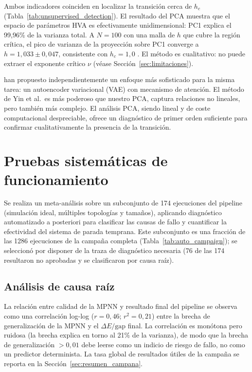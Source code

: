 \documentclass[11pt,a4paper,spanish]{book}
\begin{document}
Ambos indicadores coinciden en localizar la transición cerca de $h_c$ (Tabla~\ref{tab:unsupervised_detection}). El resultado del PCA muestra que el espacio de parámetros HVA es efectivamente unidimensional: PC1 explica el 99,96\% de la varianza total. A $N = 100$ con una malla de $h$ que cubre la región crítica, el pico de varianza de la proyección sobre PC1 converge a $h = 1,033 \pm 0,047$, consistente con $h_c = 1,0$ \citep{dutta2015}. El método es cualitativo: no puede extraer el exponente crítico $\nu$ (véase Sección~\ref{sec:limitaciones}).

\citet{yin2025} han propuesto independientemente un enfoque más sofisticado para la misma tarea: un autoencoder variacional (VAE) con mecanismo de atención. El método de Yin et al.\ es más poderoso que nuestro PCA, captura relaciones no lineales, pero también más complejo. El análisis PCA, siendo lineal y de coste computacional despreciable, ofrece un diagnóstico de primer orden suficiente para confirmar cualitativamente la presencia de la transición.

\section{Pruebas sistemáticas de funcionamiento}

Se realiza un meta-análisis sobre un subconjunto de 174 ejecuciones del pipeline (simulación ideal, múltiples topologías y tamaños), aplicando diagnóstico automatizado a posteriori para clasificar las causas de fallo y cuantificar la efectividad del sistema de parada temprana. Este subconjunto es una fracción de las 1286 ejecuciones de la campaña completa (Tabla~\ref{tab:auto_campaign}); se seleccionó por disponer de la traza de diagnóstico necesaria (76 de las 174 resultaron no aprobadas y se clasificaron por causa raíz).

\subsection{Análisis de causa raíz}

La relación entre calidad de la MPNN y resultado final del pipeline se observa como una correlación log-log ($r = 0,46$; $r^2 = 0,21$) entre la brecha de generalización de la MPNN y el $\Delta E/\text{gap}$ final. La correlación es monótona pero ruidosa (la brecha explica en torno al 21\% de la varianza), de modo que la brecha de generalización $> 0,01$ debe leerse como un indicio de riesgo de fallo, no como un predictor determinista. La tasa global de resultados útiles de la campaña se reporta en la Sección~\ref{sec:resumen_campana}.
\end{document}
